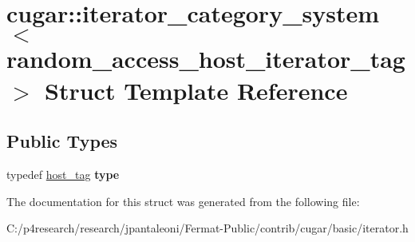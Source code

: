 \hypertarget{structcugar_1_1iterator__category__system_3_01random__access__host__iterator__tag_01_4}{}\section{cugar\+:\+:iterator\+\_\+category\+\_\+system$<$ random\+\_\+access\+\_\+host\+\_\+iterator\+\_\+tag $>$ Struct Template Reference}
\label{structcugar_1_1iterator__category__system_3_01random__access__host__iterator__tag_01_4}
\subsection*{Public Types}
\begin{DoxyCompactItemize}
\item 
\mbox{\label{structcugar_1_1iterator__category__system_3_01random__access__host__iterator__tag_01_4_ad5f1d79f6848e174347157d5c3fefec9}} 
typedef \hyperlink{structcugar_1_1host__tag}{host\+\_\+tag} {\bfseries type}
\end{DoxyCompactItemize}


The documentation for this struct was generated from the following file\+:\begin{DoxyCompactItemize}
\item 
C\+:/p4research/research/jpantaleoni/\+Fermat-\/\+Public/contrib/cugar/basic/iterator.\+h\end{DoxyCompactItemize}
